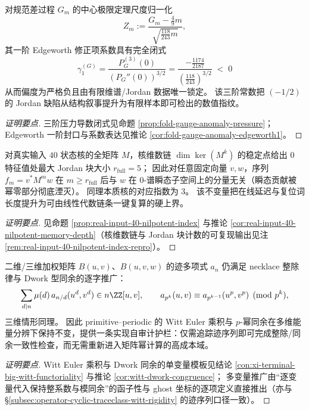\begin{conclusion}\label{con:xi-gauge-anomaly-third-order-spectral-fingerprint}
对规范差过程 \(G_m\) 的中心极限定理尺度归一化
\[
Z_m:=\frac{G_m-\frac49 m}{\sqrt{\frac{118}{243}m}},
\]
其一阶 Edgeworth 修正项系数具有完全闭式
\[
\boxed{\;
\gamma_1^{(G)}
=\frac{P_G^{(3)}(0)}{(P_G''(0))^{3/2}}
=\frac{-\frac{1174}{2187}}{\left(\frac{118}{243}\right)^{3/2}}\;<\;0\;}
\]
从而偏度为严格负且由有限维谱/Jordan 数据唯一锁定。
该三阶常数把 \((-1/2)\) 的 Jordan 缺陷从结构叙事提升为有限样本即可检出的数值指纹。
\end{conclusion}
\begin{proof}[证明要点]
三阶压力导数闭式见命题 \ref{prop:fold-gauge-anomaly-pressure}；
Edgeworth 一阶封口与系数表达见推论 \ref{cor:fold-gauge-anomaly-edgeworth1}。
\end{proof}

\begin{conclusion}\label{con:xi-nilpotent-index-transient-memory-depth}
对真实输入 \(40\) 状态核的全矩阵 \(M\)，核维数链 \(\dim\ker(M^k)\) 的稳定点给出 \(0\) 特征值处最大 Jordan 块大小 \(r_{\mathrm{full}}=5\)；
因此对任意固定向量 \(v,w\)，序列 \(f_m=v^\ast M^m w\) 在 \(m\ge r_{\mathrm{full}}\) 后与 \(w\) 在 \(0\)-谱瞬态子空间上的分量无关（瞬态贡献被幂零部分彻底湮灭）。
同理本质核的对应指数为 \(3\)。
该不变量把在线延迟与复位词长度提升为可由线性代数链条一键复算的硬上界。
\end{conclusion}
\begin{proof}[证明要点]
见命题 \ref{prop:real-input-40-nilpotent-index} 与推论 \ref{cor:real-input-40-nilpotent-memory-depth}（核维数链与 Jordan 块计数的可复现输出见注 \ref{rem:real-input-40-nilpotent-index-repro}）。
\end{proof}

\begin{conclusion}\label{con:xi-big-witt-dwork-guardrail-multivariable}
二维/三维加权矩阵 \(B(u,v)\)、\(B(u,v,w)\) 的迹多项式 \(a_n\) 仍满足 necklace 整除律与 Dwork 型同余的逐字推广：
\[
\sum_{d\mid n}\mu(d)\,a_{n/d}(u^d,v^d)\in n\ZZ[u,v],
\qquad
a_{p^k}(u,v)\equiv a_{p^{k-1}}(u^p,v^p)\pmod{p^k},
\]
三维情形同理。
因此 primitive--periodic 的 Witt Euler 乘积与 \(p\)-幂同余在多维能量分辨下保持不变，提供一条实现自审计护栏：仅需追踪迹序列即可完成整除/同余一致性检查，而无需重新进入矩阵幂计算的高成本域。
\end{conclusion}
\begin{proof}[证明要点]
Witt Euler 乘积与 Dwork 同余的单变量模板见结论 \ref{con:xi-terminal-big-witt-functoriality} 与推论 \ref{cor:witt-dwork-congruence}；
多变量推广由“逐变量代入保持整系数与模同余”的函子性与 ghost 坐标的逐项定义直接推出（亦与 \S\ref{subsec:operator-cyclic-traceclass-witt-rigidity} 的迹序列口径一致）。
\end{proof}

